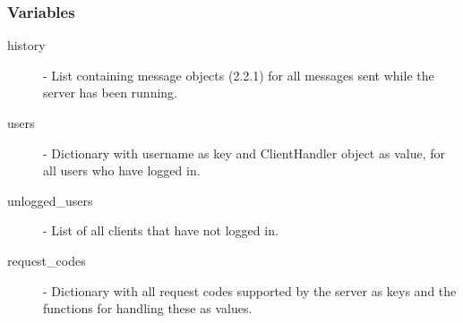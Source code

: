 \documentclass[a4paper, 12pt]{article}
\begin{document}
        \subsubsection{Variables}
            \begin{description}
                \item[history] - List containing message objects (2.2.1) for all messages sent while the server has been running.
                \item[users] - Dictionary with username as key and ClientHandler object as value, for all users who have logged in.
                \item[unlogged\_users] - List of all clients that have not logged in.
                \item[request\_codes] - Dictionary with all request codes supported by the server as keys and the functions for handling these as values.
            \end{description}
\end{document}
